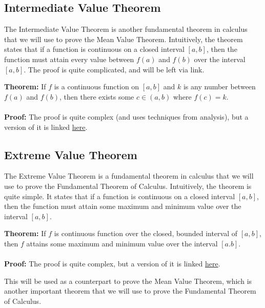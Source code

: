 \documentclass[8pt]{extarticle}
\begin{document}
\subsection{Intermediate Value Theorem}
The Intermediate Value Theorem is another fundamental theorem in calculus that we will use to prove the Mean Value Theorem. Intuitively, the theorem states that if a function is continuous on a closed interval $[a,b]$, then the function must attain every value between $f(a)$ and $f(b)$ over the interval $[a,b]$. The proof is quite complicated, and will be left via link.
\begin{boxedsection}
  \textbf{Theorem:} If $f$ is a continuous function on $[a,b]$ and $k$ is any number between $f(a)$ and $f(b)$, then there exists some $c \in (a,b)$ where $f(c) = k$.\\
  \\
  \textbf{Proof:} The proof is quite complex (and uses techniques from analysis), but a version of it is linked \href{https://math.oxford.emory.edu/site/math111/proofs/ivt/}{here}. 
\end{boxedsection}
\subsection{Extreme Value Theorem}
The Extreme Value Theorem is a fundamental theorem in calculus that we will use to prove the Fundamental Theorem of Calculus.
Intuitively, the theorem is quite simple. It states that if a function is continuous on a closed interval $[a,b]$, then the function must attain some maximum and minimum value over the interval $[a,b]$.
\begin{boxedsection}
  \textbf{Theorem:} If $f$ is continuous function over the closed, bounded interval of $[a,b]$, then $f$ attains some maximum and minimum value over the interval $[a.b]$.\\
  \\
  \textbf{Proof:} The proof is quite complex, but a version of it is linked \href{https://mathcenter.oxford.emory.edu/site/math111/proofs/extremeValueTheorem/}{here}.
\end{boxedsection}
This will be used as a counterpart to prove the Mean Value Theorem, which is another important theorem that we will use to prove the Fundamental Theorem of Calculus.
\end{document}
